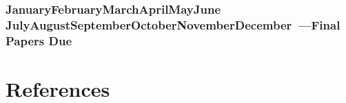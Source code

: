 \documentclass[10pt]{article}
\def\themonth{\ifcase\month\or
  January\or February\or March\or April\or May\or June\or
  July\or August\or September\or October\or November\or December\fi}
\begin{document}





\AdvanceDate[7]
\section{\themonth~\the\day---Final Papers Due}

\part{References}
%

\end{document}
